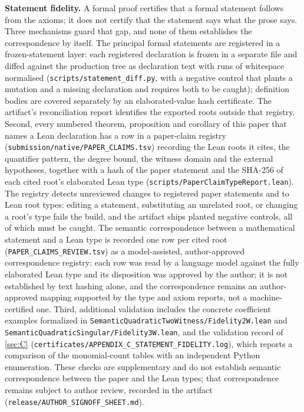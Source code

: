 \documentclass[11pt]{article}
\theoremstyle{plain}
\theoremstyle{definition}
\theoremstyle{remark}
\theoremstyle{plain}
\theoremstyle{definition}
\theoremstyle{remark}
\theoremstyle{plain}
\theoremstyle{definition}
\theoremstyle{remark}
\begin{document}
\textbf{Statement fidelity.} A formal proof certifies that a formal statement follows from the axioms; it does not certify that the statement says what the prose says. Three mechanisms guard that gap, and none of them establishes the correspondence by itself. The principal formal statements are registered in a frozen-statement layer: each registered declaration is frozen in a separate file and diffed against the production tree as declaration text with runs of whitespace normalised (\texttt{scripts/statement\_\allowbreak{}diff.\allowbreak{}py}, with a negative control that plants a mutation and a missing declaration and requires both to be caught); definition bodies are covered separately by an elaborated-value hash certificate. The artifact's reconciliation report identifies the exported roots outside that registry. Second, every numbered theorem, proposition and corollary of this paper that names a Lean declaration has a row in a paper-claim registry (\texttt{submission/native/PAPER\_\allowbreak{}CLAIMS.\allowbreak{}tsv}) recording the Lean roots it cites, the quantifier pattern, the degree bound, the witness domain and the external hypotheses, together with a hash of the paper statement and the SHA-256 of each cited root's elaborated Lean type (\texttt{scripts/PaperClaimTypeReport.\allowbreak{}lean}). The registry detects unreviewed changes to registered paper statements and to Lean root types: editing a statement, substituting an unrelated root, or changing a root's type fails the build, and the artifact ships planted negative controls, all of which must be caught. The semantic correspondence between a mathematical statement and a Lean type is recorded one row per cited root (\texttt{PAPER\_\allowbreak{}CLAIMS\_\allowbreak{}REVIEW.\allowbreak{}tsv}) as a model-assisted, author-approved correspondence registry: each row was read by a language model against the fully elaborated Lean type and its disposition was approved by the author; it is not established by text hashing alone, and the correspondence remains an author-approved mapping supported by the type and axiom reports, not a machine-certified one. Third, additional validation includes the concrete coefficient examples formalized in \texttt{SemanticQuadraticTwoWitness/Fidelity2W.\allowbreak{}lean} and \texttt{SemanticQuadraticSingular/Fidelity3W.\allowbreak{}lean}, and the validation record of \cref{sec:C} (\texttt{certificates/APPENDIX\_\allowbreak{}C\_\allowbreak{}STATEMENT\_\allowbreak{}FIDELITY.\allowbreak{}log}), which reports a comparison of the monomial-count tables with an independent Python enumeration. These checks are supplementary and do not establish semantic correspondence between the paper and the Lean types; that correspondence remains subject to author review, recorded in the artifact (\texttt{release/AUTHOR\_\allowbreak{}SIGNOFF\_\allowbreak{}SHEET.\allowbreak{}md}).
\end{document}
